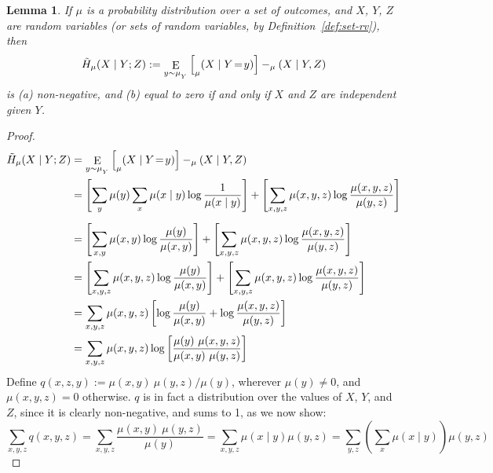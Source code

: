 \documentclass{article}
\theoremstyle{plain}
\newtheorem{lemma}[theorem]{Lemma}
\theoremstyle{definition}
\theoremstyle{remark}
\let\H\relax
\DeclareMathOperator{\H}{\mathrm{H}} %
\DeclareMathOperator{\E}{\mathrm{E}} %
\numberwithin{equation}{section}
\begin{document}
\begin{lemma} \label{lem:bnmaxent-component}
	If $\mu$ is a probability distribution over a set of outcomes, and $X$, $Y$, $Z$ are random variables (or sets of random variables, by Definition~\ref{def:set-rv}), then 
	\[ \tilde H_\mu(X \mid Y; Z) := \E_{y \sim \mu_{_{Y}}} \Big[ \H_\mu(X \mid Y \!=\!y) \Big]  - \H_\mu( X \mid Y, Z)\]
	is (a) non-negative, and (b) equal to zero if and only if $X$ and $Z$ are independent given $Y$.
\end{lemma}
\begin{proof}
	\begin{align*}
		\tilde H_\mu(X \mid Y; Z) &= \E_{y \sim \mu_{_{Y}}}  \Big[ \H_\mu(X \mid Y \!=\!y)\Big] - \H_\mu( X \mid Y, Z)  \\
		&=  \left[\sum_{y} \mu(y) \sum_x  \mu(x\mid y) \log \frac{1}{\mu(x \mid y)} \right]+ \left[\sum_{x,y, z} \mu(x, y, z) \log \frac{\mu(x,y,z)}{\mu(y, z)}\right] \\[0.5em]
		&= \left[\sum_{x,y} \mu(x,y) \log \frac{\mu(y)}{\mu(x,y)}
		\right] + {\left[\sum_{x,y, z} \mu(x, y, z) \log \frac{\mu(x,y,z)}{\mu(y, z)} \right]} \\
		&= \left[\sum_{x,y, z} \mu(x,y ,z) \log \frac{\mu(y)}{\mu(x,y)}
		\right] + {\left[\sum_{x,y, z} \mu(x, y, z) \log \frac{\mu(x,y,z)}{\mu(y, z)} \right]} \\
		&= \sum_{x,y, z} \mu(x,y ,z) \left[ \log \frac{\mu(y)}{\mu(x,y)} + \log \frac{\mu(x,y,z)}{\mu(y, z)} \right] \\
		&= \sum_{x,y, z}  \mu(x,y ,z) \log \left[\frac{\mu(y)\ \mu(x,y,z)}{\mu(x,y)\ \mu(y,z)} \right]  \\
	\end{align*}
	Define $q(x,z,y) := {\mu(x,y)\ \mu(y,z) }/{\mu(y)}$, wherever $\mu(y)\neq 0$, and $\mu(x,y,z) = 0$ otherwise. $q$ is in fact a distribution over the values of $X$, $Y$, and $Z$, since it 
	is clearly non-negative, and sums to 1, as we now show:
	\[
	\sum_{x,y,z} q(x,y, z) = \sum_{x,y,z} \frac{\mu(x,y)\ \mu(y,z)}{\mu(y)}
	= \sum_{x,y,z} \mu(x \mid y) \mu(y,z)
	= \sum_{y,z} \left(\sum_x \mu(x \mid y)\right) \mu(y,z)
\]
\end{proof}
\end{document}

